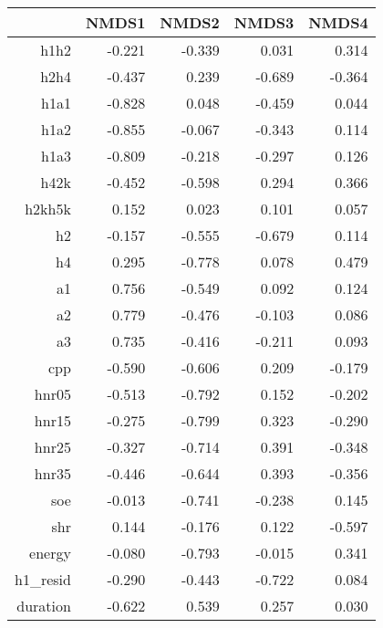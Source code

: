 \begin{table}[ht]
\centering
\begin{tabular}{rrrrr}
  \hline
 & NMDS1 & NMDS2 & NMDS3 & NMDS4 \\ 
  \hline
h1h2 & -0.221 & -0.339 & 0.031 & 0.314 \\ 
  h2h4 & -0.437 & 0.239 & -0.689 & -0.364 \\ 
  h1a1 & -0.828 & 0.048 & -0.459 & 0.044 \\ 
  h1a2 & -0.855 & -0.067 & -0.343 & 0.114 \\ 
  h1a3 & -0.809 & -0.218 & -0.297 & 0.126 \\ 
  h42k & -0.452 & -0.598 & 0.294 & 0.366 \\ 
  h2kh5k & 0.152 & 0.023 & 0.101 & 0.057 \\ 
  h2 & -0.157 & -0.555 & -0.679 & 0.114 \\ 
  h4 & 0.295 & -0.778 & 0.078 & 0.479 \\ 
  a1 & 0.756 & -0.549 & 0.092 & 0.124 \\ 
  a2 & 0.779 & -0.476 & -0.103 & 0.086 \\ 
  a3 & 0.735 & -0.416 & -0.211 & 0.093 \\ 
  cpp & -0.590 & -0.606 & 0.209 & -0.179 \\ 
  hnr05 & -0.513 & -0.792 & 0.152 & -0.202 \\ 
  hnr15 & -0.275 & -0.799 & 0.323 & -0.290 \\ 
  hnr25 & -0.327 & -0.714 & 0.391 & -0.348 \\ 
  hnr35 & -0.446 & -0.644 & 0.393 & -0.356 \\ 
  soe & -0.013 & -0.741 & -0.238 & 0.145 \\ 
  shr & 0.144 & -0.176 & 0.122 & -0.597 \\ 
  energy & -0.080 & -0.793 & -0.015 & 0.341 \\ 
  h1\_resid & -0.290 & -0.443 & -0.722 & 0.084 \\ 
  duration & -0.622 & 0.539 & 0.257 & 0.030 \\ 
   \hline
\end{tabular}
\end{table}
